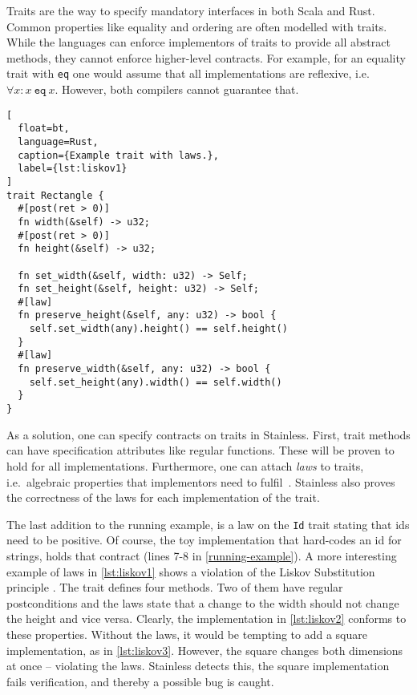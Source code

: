 Traits are the way to specify mandatory interfaces in both Scala and Rust.
Common properties like equality and ordering are often modelled with traits.
While the languages can enforce implementors of traits to provide all abstract
methods, they cannot enforce higher-level contracts. For example, for an
equality trait with \texttt{eq} one would assume that all implementations are
reflexive, i.e. $\forall x: x~\mathtt{eq}~x$. However, both compilers cannot
guarantee that.

\begin{lstlisting}[
  float=bt,
  language=Rust,
  caption={Example trait with laws.},
  label={lst:liskov1}
]
trait Rectangle {
  #[post(ret > 0)]
  fn width(&self) -> u32;
  #[post(ret > 0)]
  fn height(&self) -> u32;

  fn set_width(&self, width: u32) -> Self;
  fn set_height(&self, height: u32) -> Self;
  #[law]
  fn preserve_height(&self, any: u32) -> bool {
    self.set_width(any).height() == self.height()
  }
  #[law]
  fn preserve_width(&self, any: u32) -> bool {
    self.set_height(any).width() == self.width()
  }
}
\end{lstlisting}


As a solution, one can specify contracts on traits in Stainless. First, trait
methods can have specification attributes like regular functions. These will be
proven to hold for all implementations. Furthermore, one can attach \emph{laws}
to traits, i.e.~algebraic properties that implementors need to
fulfil~\cite[section "Specifying Algebraic Properties"]{stainless-doc}.
Stainless also proves the correctness of the laws for each implementation of the
trait.

The last addition to the running example, is a law on the \lstinline!Id! trait
stating  that ids need to be positive. Of course, the toy implementation that
hard-codes an id for strings, holds that contract (lines 7-8 in
\autoref{running-example}). A more interesting example of laws in
\autoref{lst:liskov1} shows a violation of the  Liskov Substitution principle
\cite{liskov}. The trait defines four methods. Two of them have regular
postconditions and the laws state that a change to the width should not change
the height and vice versa. Clearly, the implementation in \autoref{lst:liskov2}
conforms to these properties. Without the laws, it would be tempting to add a
square implementation, as in \autoref{lst:liskov3}. However, the square changes
both dimensions at once -- violating the laws. Stainless detects this, the
square implementation fails verification, and thereby a possible bug is caught.
\newpage

